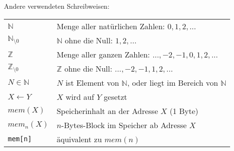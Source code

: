 Andere verwendeten Schreibweisen:
\begin{center}
\begin{tabular}{l|l}\toprule
 $\mathds{N}$ & Menge aller natürlichen Zahlen: $0,1,2,\ldots$         \\
 $\mathds{N}_{\setminus 0}$ 
              & $\mathds{N}$ ohne die Null: $1,2,\ldots$               \\
 $\mathds{Z}$ & Menge aller ganzen Zahlen: $\ldots,-2,-1,0,1,2,\ldots$ \\
 $\mathds{Z}_{\setminus 0}$ 
              & $\mathds{Z}$ ohne die Null: $\ldots,-2,-1,1,2,\ldots$  \\
 $N \in \mathds{N}$
              & $N$ ist Element von $\mathds{N}$, oder liegt im Bereich von
              $\mathds{N}$                                             \\
 $X \gets Y$  & $X$ wird auf $Y$ gesetzt                               \\
 $mem(X)$     & Speicherinhalt an der Adresse $X$ (1 Byte)             \\
 $mem_{n}(X)$ & $n$-Bytes-Block im Speicher ab Adresse $X$             \\
 \texttt{mem[n]}
              & äquivalent zu $mem(n)$                                 \\
\bottomrule
\end{tabular}
\end{center} 

